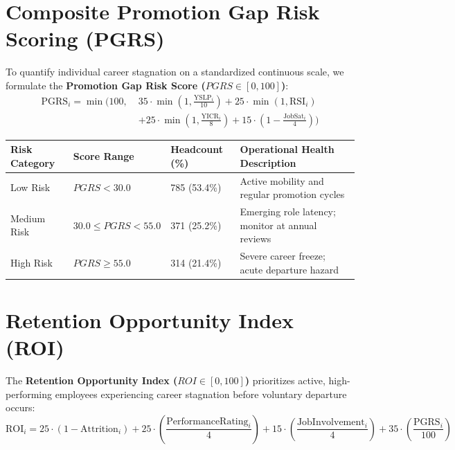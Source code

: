 \documentclass[12pt,a4paper,oneside]{report}
\begin{document}
\section{Composite Promotion Gap Risk Scoring (PGRS)}
To quantify individual career stagnation on a standardized continuous scale, we formulate the \textbf{Promotion Gap Risk Score ($PGRS \in [0, 100]$)}:
\begin{equation}
\begin{aligned}
\text{PGRS}_i = \min\Big(100, \; & 35 \cdot \min\left(1, \frac{\text{YSLP}_i}{10}\right) + 25 \cdot \min\left(1, \text{RSI}_i\right) \\
& + 25 \cdot \min\left(1, \frac{\text{YICR}_i}{8}\right) + 15 \cdot \left(1 - \frac{\text{JobSat}_i}{4}\right)\Big)
\end{aligned}
\end{equation}

\begin{center}
\begin{tabular}{|C{2.8cm}|C{3.2cm}|C{3.0cm}|L{6.9cm}|}
\hline
\textbf{Risk Category} & \textbf{Score Range} & \textbf{Headcount (\%)} & \textbf{Operational Health Description} \\ \hline
Low Risk & $PGRS < 30.0$ & 785 (53.4\%) & Active mobility and regular promotion cycles \\ \hline
Medium Risk & $30.0 \le PGRS < 55.0$ & 371 (25.2\%) & Emerging role latency; monitor at annual reviews \\ \hline
High Risk & $PGRS \ge 55.0$ & 314 (21.4\%) & Severe career freeze; acute departure hazard \\ \hline
\end{tabular}
\vspace{0.05in}
\label{tab:pgrs_stratification}
\end{center}

\section{Retention Opportunity Index (ROI)}
The \textbf{Retention Opportunity Index ($ROI \in [0, 100]$)} prioritizes active, high-performing employees experiencing career stagnation before voluntary departure occurs:
\begin{equation}
\text{ROI}_i = 25 \cdot (1 - \text{Attrition}_i) + 25 \cdot \left(\frac{\text{PerformanceRating}_i}{4}\right) + 15 \cdot \left(\frac{\text{JobInvolvement}_i}{4}\right) + 35 \cdot \left(\frac{\text{PGRS}_i}{100}\right)
\end{equation}
\end{document}

